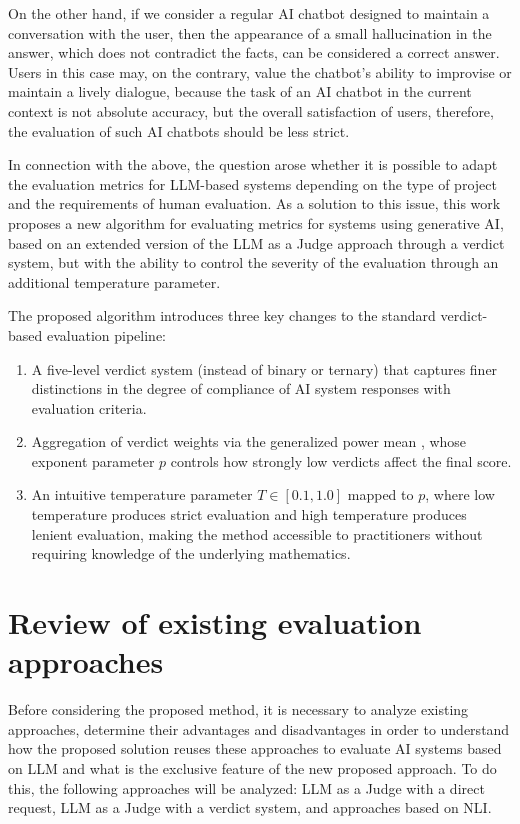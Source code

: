 \documentclass[sn-basic]{sn-jnl}
\theoremstyle{thmstyleone}%
\theoremstyle{thmstyletwo}%
\theoremstyle{thmstylethree}%
\begin{document}
On the other hand, if we consider a regular AI chatbot designed to maintain a conversation with the user, then the appearance of a small hallucination in the answer, which does not contradict the facts, can be considered a correct answer. Users in this case may, on the contrary, value the chatbot's ability to improvise or maintain a lively dialogue, because the task of an AI chatbot in the current context is not absolute accuracy, but the overall satisfaction of users, therefore, the evaluation of such AI chatbots should be less strict.

In connection with the above, the question arose whether it is possible to adapt the evaluation metrics for LLM-based systems depending on the type of project and the requirements of human evaluation. As a solution to this issue, this work proposes a new algorithm for evaluating metrics for systems using generative AI, based on an extended version of the LLM as a Judge approach through a verdict system, but with the ability to control the severity of the evaluation through an additional temperature parameter.

The proposed algorithm introduces three key changes to the standard verdict-based evaluation pipeline:
\begin{enumerate}
   \item A five-level verdict system (instead of binary or ternary) that captures finer distinctions in the degree of compliance of AI system responses with evaluation criteria.
   \item Aggregation of verdict weights via the generalized power mean \cite{Hwang1981}, whose exponent parameter $p$ controls how strongly low verdicts affect the final score.
   \item An intuitive temperature parameter $T \in [0.1, 1.0]$ mapped to $p$, where low temperature produces strict evaluation and high temperature produces lenient evaluation, making the method accessible to practitioners without requiring knowledge of the underlying mathematics.
\end{enumerate}

\section{Review of existing evaluation approaches}

Before considering the proposed method, it is necessary to analyze existing approaches, determine their advantages and disadvantages in order to understand how the proposed solution reuses these approaches to evaluate AI systems based on LLM and what is the exclusive feature of the new proposed approach. To do this, the following approaches will be analyzed: LLM as a Judge with a direct request, LLM as a Judge with a verdict system, and approaches based on NLI.
\end{document}
